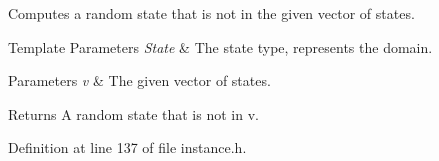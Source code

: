 Computes a random state that is not in the given vector of states. 


\begin{DoxyTemplParams}{Template Parameters}
{\em State} & The state type, represents the domain. \\
\hline
\end{DoxyTemplParams}

\begin{DoxyParams}{Parameters}
{\em v} & The given vector of states. \\
\hline
\end{DoxyParams}
\begin{DoxyReturn}{Returns}
A random state that is not in {\ttfamily v}. 
\end{DoxyReturn}


Definition at line 137 of file instance.\+h.


